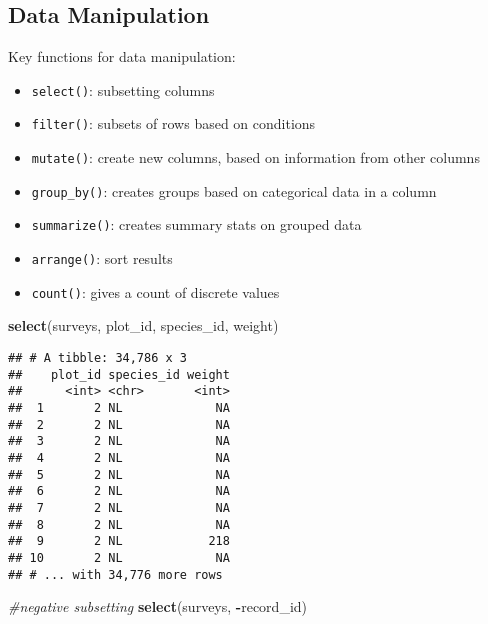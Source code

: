 \documentclass[]{article}
\newenvironment{Shaded}{\begin{snugshade}}{\end{snugshade}}
\newcommand{\KeywordTok}[1]{\textcolor[rgb]{0.13,0.29,0.53}{\textbf{#1}}}
\newcommand{\CommentTok}[1]{\textcolor[rgb]{0.56,0.35,0.01}{\textit{#1}}}
\newcommand{\OperatorTok}[1]{\textcolor[rgb]{0.81,0.36,0.00}{\textbf{#1}}}
\newcommand{\NormalTok}[1]{#1}
\providecommand{\tightlist}{%
  \setlength{\itemsep}{0pt}\setlength{\parskip}{0pt}}
\begin{document}
\subsection{Data Manipulation}\label{data-manipulation}

Key functions for data manipulation:

\begin{itemize}
\tightlist
\item
  \texttt{select()}: subsetting columns
\item
  \texttt{filter()}: subsets of rows based on conditions
\item
  \texttt{mutate()}: create new columns, based on information from other
  columns
\item
  \texttt{group\_by()}: creates groups based on categorical data in a
  column
\item
  \texttt{summarize()}: creates summary stats on grouped data
\item
  \texttt{arrange()}: sort results
\item
  \texttt{count()}: gives a count of discrete values
\end{itemize}

\begin{Shaded}
\begin{Highlighting}[]
\KeywordTok{select}\NormalTok{(surveys, plot_id, species_id, weight)}
\end{Highlighting}
\end{Shaded}

\begin{verbatim}
## # A tibble: 34,786 x 3
##    plot_id species_id weight
##      <int> <chr>       <int>
##  1       2 NL             NA
##  2       2 NL             NA
##  3       2 NL             NA
##  4       2 NL             NA
##  5       2 NL             NA
##  6       2 NL             NA
##  7       2 NL             NA
##  8       2 NL             NA
##  9       2 NL            218
## 10       2 NL             NA
## # ... with 34,776 more rows
\end{verbatim}

\begin{Shaded}
\begin{Highlighting}[]
\CommentTok{#negative subsetting}
\KeywordTok{select}\NormalTok{(surveys, }\OperatorTok{-}\NormalTok{record_id)}
\end{Highlighting}
\end{Shaded}
\end{document}
